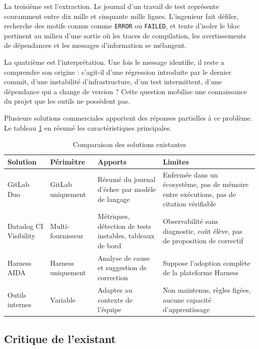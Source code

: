 \documentclass[12pt,a4paper,oneside]{report}
\begin{document}
La troisième est l'extraction. Le journal d'un travail de test représente
couramment entre dix mille et cinquante mille lignes. L'ingenieur fait défiler,
recherche des motifs connus comme \texttt{ERROR} ou \texttt{FAILED}, et tente
d'isoler le bloc pertinent au milieu d'une sortie où les traces de compilation,
les avertissements de dépendances et les messages d'information se mélangent.

La quatrième est l'interprétation. Une fois le message identifie, il reste a
comprendre son origine : s'agit-il d'une régression introduite par le dernier
commit, d'une instabilité d'infrastructure, d'un test intermittent, d'une
dépendance qui a change de version ? Cette question mobilise une connaissance du
projet que les outils ne possèdent pas.

Plusieurs solutions commerciales apportent des réponses partielles à ce problème.
Le tableau \ref{tab:existant} en résumé les caractéristiques principales.

\begin{table}[htbp]
\centering
\caption{Comparaison des solutions existantes}
\label{tab:existant}
\small
\begin{tabularx}{\textwidth}{@{}lXXX@{}}
\toprule
\textbf{Solution} & \textbf{Périmètre} & \textbf{Apports} & \textbf{Limites} \\
\midrule
GitLab Duo & GitLab uniquement & Résumé du journal d'échec par modèle de langage & Enfermée dans un écosystème, pas de mémoire entre exécutions, pas de citation vérifiable \\
\addlinespace
Datadog CI Visibility & Multi-fournisseur & Métriques, détection de tests instables, tableaux de bord & Observabilité sans diagnostic, coût élève, pas de proposition de correctif \\
\addlinespace
Harness AIDA & Harness uniquement & Analyse de cause et suggestion de correction & Suppose l'adoption complète de la plateforme Harness \\
\addlinespace
Outils internes & Variable & Adaptes au contexte de l'équipe & Non maintenus, règles figées, aucune capacité d'apprentissage \\
\bottomrule
\end{tabularx}
\end{table}

\subsection{Critique de l'existant}
\end{document}
